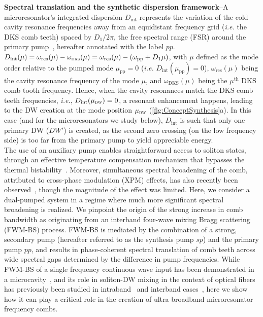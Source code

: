 \documentclass[reprint,superscriptaddress, amsmath,amssymb,pra, aps,floatfix,longbibliography]{revtex4-1}
\begin{document}
\noindent \textbf{Spectral translation and the synthetic dispersion framework}--A microresonator's integrated dispersion $D_\mathrm{int}$ represents the variation of the cold cavity resonance frequencies away from an equidistant frequency grid (\textit{i.e.} the DKS comb teeth) spaced by $D_1/2 \pi$, the free spectral range (FSR) around the primary pump~\cite{kippenberg_dissipative_2018},  hereafter annotated with the label $pp$. $D_\mathrm{int}(\mu) = \omega_\mathrm{res}(\mu) - \omega_\mathrm{\textsc{dks}}(\mu)  = \omega_\mathrm{res}(\mu) -  \left(\omega_\mathrm{pp} + D_1 \mu \right)$, with $\mu$ defined as the mode order relative to the pumped mode $\mu_\mathrm{pp} = 0$ (\textit{i.e.} $D_\mathrm{int}(\mu_\mathrm{pp})=0$), $\omega_\mathrm{res}(\mu)$ being the cavity resonance frequency of the mode $\mu$, and $\omega_\mathrm{DKS}(\mu)$ being the $\mu^{\text{th}}$ DKS comb tooth frequency. Hence, when the cavity resonances match the DKS comb teeth frequencies, \textit{i.e.}, $D_\mathrm{int}(\mu_\mathrm{\textsc{dw}})=0$, a resonant enhancement happens, leading to the DW creation at the mode position $\mu_\mathrm{\textsc{dw}}$ (\cref{fig:ConceptSynthesis}a).
%
In this case (and for the microresonators we study below),  $D_\mathrm{int}$ is such that only one primary DW ($DW'$) is created, as the second zero crossing (on the low frequency side) is too far from the primary pump to yield appreciable energy. \\
%
{\indent}The use of an auxiliary pump enables straightforward access to soliton states, through an effective temperature compensation mechanism that bypasses the thermal bistability~\cite{lu_deterministic_2019, zhou_soliton_2019,zhang_sub-milliwatt-level_2019}. Moreover, simultaneous spectral broadening of the comb, attributed to cross-phase modulation (XPM) effects, has also recently been observed~\cite{zhang_spectral_2020}, though the magnitude of the effect was limited. Here, we consider a dual-pumped system in a regime where much more significant spectral broadening is realized. We pinpoint the origin of the strong increase in comb bandwidth as originating from an interband four-wave mixing Bragg scattering (FWM-BS) process. FWM-BS is mediated by the combination of a strong, secondary pump (hereafter referred to as the synthesis pump $sp$) and the primary pump $pp$, and results in phase-coherent spectral translation of comb teeth across wide spectral gaps determined by the difference in pump frequencies. While FWM-BS of a single frequency continuous wave input has been demonstrated in a microcavity~\cite{li_efficient_2016}, and its role in soliton-DW mixing in the context of optical fibers has previously been studied in intraband~\cite{xu_cascaded_2013} and interband cases~\cite{yulin_four-wave_2004}, here we show how it can play a critical role in the creation of ultra-broadband microresonator frequency combs.
\end{document}
